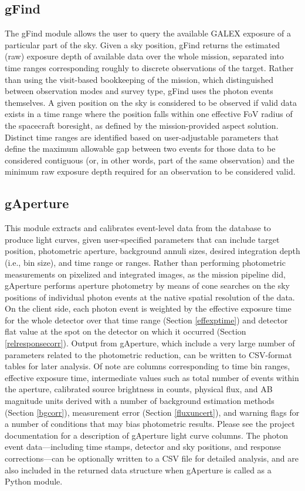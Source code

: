 \documentclass[iop]{emulateapj}
\begin{document}
\subsection{gFind}
\label{gfind}
The gFind module allows the user to query the available GALEX exposure of a particular part of the sky. Given a sky position, gFind returns the estimated (raw) exposure depth of available data over the whole mission, separated into time ranges corresponding roughly to discrete observations of the target. Rather than using the visit-based bookkeeping of the mission, which distinguished between observation modes and survey type, gFind uses the photon events themselves. A given position on the sky is considered to be observed if valid data exists in a time range where the position falls within one effective FoV radius of the spacecraft boresight, as defined by the mission-provided aspect solution. Distinct time ranges are identified based on user-adjustable parameters that define the maximum allowable gap between two events for those data to be considered contiguous (or, in other words, part of the same observation) and the minimum raw exposure depth required for an observation to be considered valid.

\subsection{gAperture}
This module extracts and calibrates event-level data from the database to produce light curves, given user-specified parameters that can include target position, photometric aperture, background annuli sizes, desired integration depth (i.e., bin size), and time range or ranges. Rather than performing photometric measurements on pixelized and integrated images, as the mission pipeline did, gAperture performs aperture photometry by means of cone searches on the sky positions of individual photon events at the native spatial resolution of the data. On the client side, each photon event is weighted by the effective exposure time for the whole detector over that time range (Section \ref{effexptime}) and detector flat value at the spot on the detector on which it occurred (Section \ref{relresponsecorr}). Output from gAperture, which include a very large number of parameters related to the photometric reduction, can be written to CSV-format tables for later analysis. Of note are columns corresponding to time bin ranges, effective exposure time, intermediate values such as total number of events within the aperture, calibrated source brightness in counts, physical flux, and AB magnitude units derived with a number of background estimation methods (Section \ref{bgcorr}), measurement error (Section \ref{fluxuncert}), and warning flags for a number of conditions that may bias photometric results. Please see the project documentation for a description of gAperture light curve columns. The photon event data---including time stamps, detector and sky positions, and response corrections---can be optionally written to a CSV file for detailed analysis, and are also included in the returned data structure when gAperture is called as a Python module.
\end{document}
